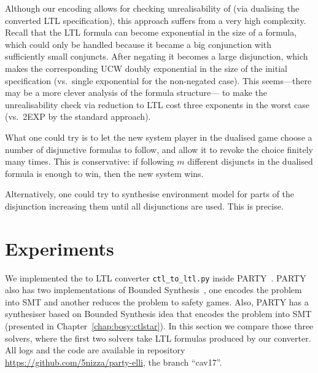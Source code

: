 Although our encoding allows for checking unrealisability of \CTLstar
(via dualising the converted LTL specification),
this approach suffers from a very high complexity.
Recall that the LTL formula can become exponential in the size of a \CTLstar formula,
which could only be handled
because it became a big conjunction with sufficiently small conjuncts.
After negating it becomes a large disjunction,
which makes the corresponding UCW doubly exponential in the size of the initial \CTLstar specification
(vs.\ single exponential for the non-negated case).
This seems---there may be a more clever analysis of the formula structure---%
to make the unrealisability check via reduction to LTL cost three exponents in the worst case
(vs.\ 2EXP by the standard approach).

What one could try is to let the new system player in the dualised game
choose a number of disjunctive formulas to follow,
and allow it to revoke the choice finitely many times.
This is conservative:
if following $m$ different disjuncts in the dualised formula is enough to win,
then the new system wins.

Alternatively, one could try to synthesise environment model for parts of the disjunction
increasing them until all disjunctions are used.
This is precise.




\section{Experiments}\label{sec:experiments}

We implemented the \CTLstar to LTL converter {\small\tt ctl\_to\_ltl.py} inside PARTY~\cite{party}.
PARTY also has two implementations of Bounded Synthesis~\cite{BS},
one encodes the problem into SMT and another reduces the problem to safety games.
Also, PARTY has a \CTLstar synthesiser based on Bounded Synthesis idea
that encodes the problem into SMT (presented in Chapter~\ref{chap:bosy:ctlstar}).
In this section we compare those three solvers,
where the first two solvers take LTL formulas produced by our converter.
All logs and the code are available in repository {\small\url{https://github.com/5nizza/party-elli}},
the branch ``cav17''.

